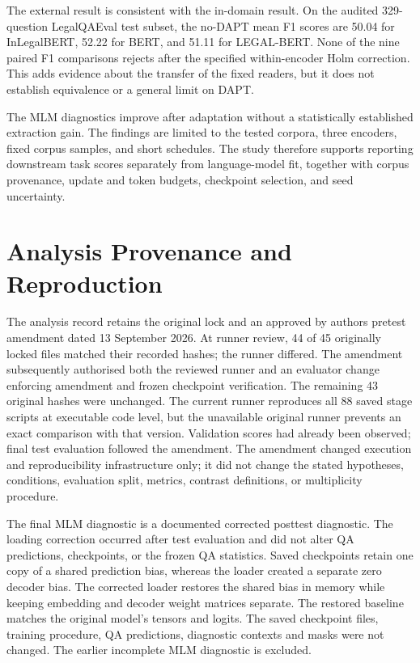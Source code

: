 \documentclass[pdflatex,sn-basic]{sn-jnl}
\begin{document}
The external result is consistent with the in-domain result. On the audited
329-question LegalQAEval test subset, the no-DAPT mean F1 scores are 50.04 for
InLegalBERT, 52.22 for BERT, and 51.11 for LEGAL-BERT. None of the nine paired
F1 comparisons rejects after the specified within-encoder Holm correction.
This adds evidence about the transfer of the fixed readers, but it does not
establish equivalence or a general limit on DAPT.

The MLM diagnostics improve after adaptation without a statistically
established extraction gain. The findings are limited to the tested corpora,
three encoders, fixed corpus samples, and short schedules. The study therefore
supports reporting downstream task scores separately from language-model fit,
together with corpus provenance, update and token budgets, checkpoint selection,
and seed uncertainty.

\FloatBarrier
\appendix
\section{Analysis Provenance and Reproduction}\label{sec:analysis_provenance}

The analysis record retains the original lock and an approved by authors
pretest amendment dated 13 September 2026. At runner review, 44 of 45
originally locked files matched their recorded hashes; the runner differed.
The amendment subsequently authorised both the reviewed runner and an
evaluator change enforcing amendment and frozen checkpoint verification.
The remaining 43 original hashes were unchanged. The current runner
reproduces all 88 saved stage scripts at executable code level, but the
unavailable original runner prevents an exact comparison with that version.
Validation scores had already been observed; final test evaluation followed
the amendment.
The amendment changed execution and reproducibility infrastructure only; it
did not change the stated hypotheses, conditions, evaluation split, metrics,
contrast definitions, or multiplicity procedure.

The final MLM diagnostic is a documented corrected posttest diagnostic. The
loading correction occurred after test evaluation and did not alter QA
predictions, checkpoints, or the frozen QA statistics.
Saved checkpoints retain one copy of a shared prediction bias, whereas the
loader created a separate zero decoder bias. The corrected loader restores
the shared bias in memory while keeping embedding and decoder weight matrices
separate. The restored baseline matches the original model's tensors and
logits. The saved checkpoint files, training procedure, QA predictions,
diagnostic contexts and masks were not changed. The earlier incomplete MLM
diagnostic is excluded.
\end{document}

